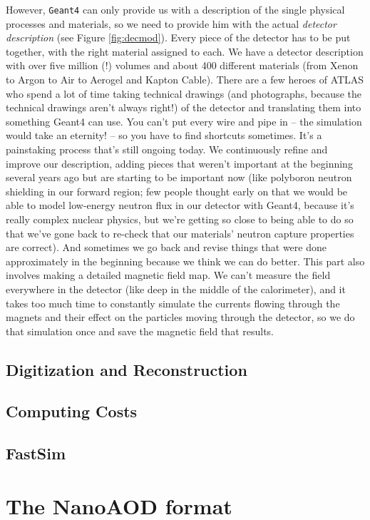 However, \texttt{Geant4} can only provide us with a description of the single physical processes and materials, so we need to provide him with the actual \emph{detector description} (see Figure \ref{fig:decmod}). Every piece of the detector has to be put together, with the right material assigned to each. We have a detector description with over five million (!) volumes and about 400 different materials (from Xenon to Argon to Air to Aerogel and Kapton Cable). There are a few heroes of ATLAS who spend a lot of time taking technical drawings (and photographs, because the technical drawings aren’t always right!) of the detector and translating them into something Geant4 can use. You can’t put every wire and pipe in – the simulation would take an eternity! – so you have to find shortcuts sometimes. It’s a painstaking process that’s still ongoing today. We continuously refine and improve our description, adding pieces that weren’t important at the beginning several years ago but are starting to be important now (like polyboron neutron shielding in our forward region; few people thought early on that we would be able to model low-energy neutron flux in our detector with Geant4, because it’s really complex nuclear physics, but we’re getting so close to being able to do so that we’ve gone back to re-check that our materials’ neutron capture properties are correct). And sometimes we go back and revise things that were done approximately in the beginning because we think we can do better. This part also involves making a detailed magnetic field map. We can’t measure the field everywhere in the detector (like deep in the middle of the calorimeter), and it takes too much time to constantly simulate the currents flowing through the magnets and their effect on the particles moving through the detector, so we do that simulation once and save the magnetic field that results.
\subsection{Digitization and Reconstruction} 

\subsection{Computing Costs}

\subsection{FastSim}

\section{The NanoAOD format}




